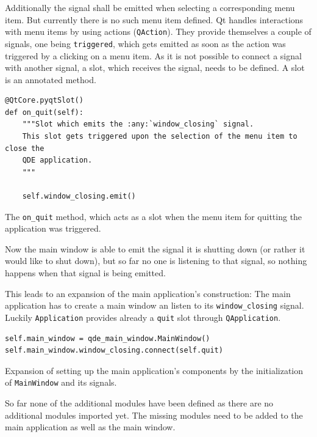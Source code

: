 \documentclass[10pt, openright, notitlepage]{scrreprt}
\begin{document}
Additionally the signal shall be emitted when selecting a corresponding menu
item. But currently there is no such menu item defined. Qt handles interactions
with menu items by using actions (\texttt{QAction}). They provide themselves a couple
of signals, one being \texttt{triggered}, which gets emitted as soon as the action was
triggered by a clicking on a menu item. As it is not possible to connect a
signal with another signal, a slot, which receives the signal, needs to be
defined. A slot is an annotated method.

\begin{listing}[H]
\begin{verbatim}
@QtCore.pyqtSlot()
def on_quit(self):
    """Slot which emits the :any:`window_closing` signal.
    This slot gets triggered upon the selection of the menu item to close the
    QDE application.
    """

    self.window_closing.emit()
\end{verbatim}
\caption{\label{main-window-slots}
The \texttt{on\_quit} method, which acts as a slot when the menu item for quitting the application was triggered.}
\end{listing}

Now the main window is able to emit the signal it is shutting down (or
rather it would like to shut down), but so far no one is listening to that
signal, so nothing happens when that signal is being emitted.

This leads to an expansion of the main application's construction: The main
application has to create a main window an listen to its \texttt{window\_closing}
signal. Luckily \texttt{Application} provides already a \texttt{quit} slot through
\texttt{QApplication}.

\begin{listing}[H]
\begin{verbatim}
self.main_window = qde_main_window.MainWindow()
self.main_window.window_closing.connect(self.quit)
\end{verbatim}
\caption{\label{app-application-methods-setup-components}
Expansion of setting up the main application's components by the initialization of \texttt{MainWindow} and its signals.}
\end{listing}

So far none of the additional modules have been defined as there are no
additional modules imported yet. The missing modules need to be added to the
main application as well as the main window.
\end{document}
